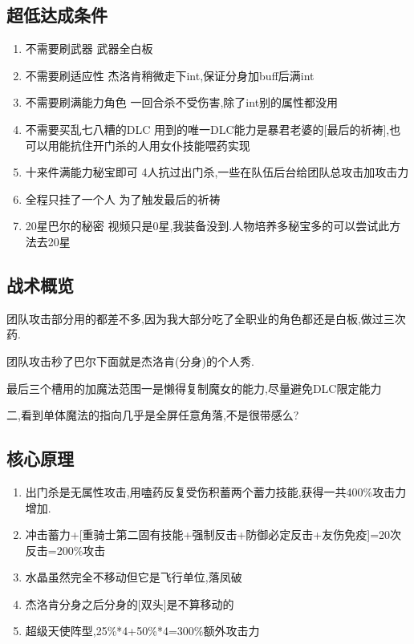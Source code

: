 	\subsection{超低达成条件}
	\begin{enumerate}
		\item{不需要刷武器}
		武器全白板

		\item{不需要刷适应性}
		杰洛肯稍微走下int,保证分身加buff后满int

		\item{不需要刷满能力角色}
		一回合杀不受伤害,除了int别的属性都没用

		\item{不需要买乱七八糟的DLC}
		用到的唯一DLC能力是暴君老婆的[最后的祈祷],也可以用能抗住开门杀的人用女仆技能喂药实现

		\item{十来件满能力秘宝即可}
		4人抗过出门杀,一些在队伍后台给团队总攻击加攻击力

		\item{全程只挂了一个人}
		为了触发最后的祈祷

		\item{20星巴尔的秘密}
		视频只是0星,我装备没到.人物培养多秘宝多的可以尝试此方法去20星
	\end{enumerate}

	\subsection{战术概览}

	团队攻击部分用{\color{red}{大魔拳超魔流刷过全职业}}的都差不多,因为我大部分吃了全职业的角色都还是白板,做过三次药.

	团队攻击秒了巴尔下面就是杰洛肯(分身)的个人秀.

	最后三个槽用的加魔法范围一是懒得复制魔女的能力,尽量避免DLC限定能力
	
	二,看到单体魔法的指向几乎是全屏任意角落,不是很带感么?

	\subsection{核心原理}

	\begin{enumerate}
		\item 出门杀是无属性攻击,用嗑药反复受伤积蓄两个蓄力技能,获得一共400\%攻击力增加.

		\item 冲击蓄力+[重骑士第二固有技能+强制反击+防御必定反击+友伤免疫]=20次反击=200\%攻击

		\item 水晶虽然完全不移动但它是飞行单位,落凤破

		\item 杰洛肯分身之后分身的[双头]是不算移动的
		
		\item 超级天使阵型,25\%*4+50\%*4=300\%额外攻击力
	\end{enumerate}

